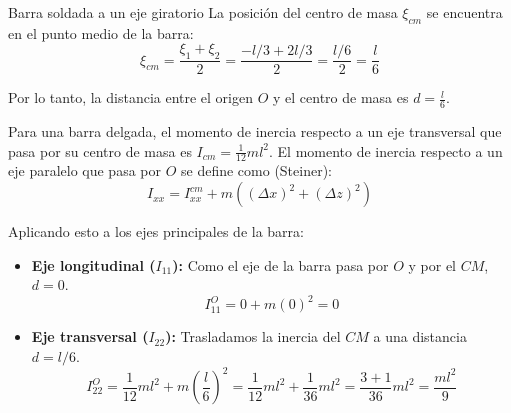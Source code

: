 \begin{solucion}{Barra soldada a un eje giratorio}
La posición del centro de masa $\xi_{cm}$ se encuentra en el punto medio de la barra:
$$\xi_{cm} = \frac{\xi_1 + \xi_2}{2} = \frac{-l/3 + 2l/3}{2} = \frac{l/6}{2} = \frac{l}{6}$$

Por lo tanto, la distancia entre el origen $O$ y el centro de masa es $d = \frac{l}{6}$.

\begin{center}
\end{center}

Para una barra delgada, el momento de inercia respecto a un eje transversal que pasa por su centro de masa es $I_{cm} = \frac{1}{12}ml^2$. El momento de inercia respecto a un eje paralelo que pasa por $O$ se define como (Steiner):
$$I_{xx} = I^{cm}_{xx} + m \left((\Delta x)^2+(\Delta z)^2\right)$$

Aplicando esto a los ejes principales de la barra:
\begin{itemize}
    \item \textbf{Eje longitudinal ($I_{11}$):} Como el eje de la barra pasa por $O$ y por el $CM$, $d=0$.
    $$I_{11}^O = 0 + m(0)^2 = 0$$

    \item \textbf{Eje transversal ($I_{22}$):} Trasladamos la inercia del $CM$ a una distancia $d = l/6$.
    $$I_{22}^O = \frac{1}{12}ml^2 + m\left( \frac{l}{6} \right)^2 = \frac{1}{12}ml^2 + \frac{1}{36}ml^2 = \frac{3+1}{36}ml^2 = \frac{ml^2}{9}$$


\end{itemize}
\end{solucion}
